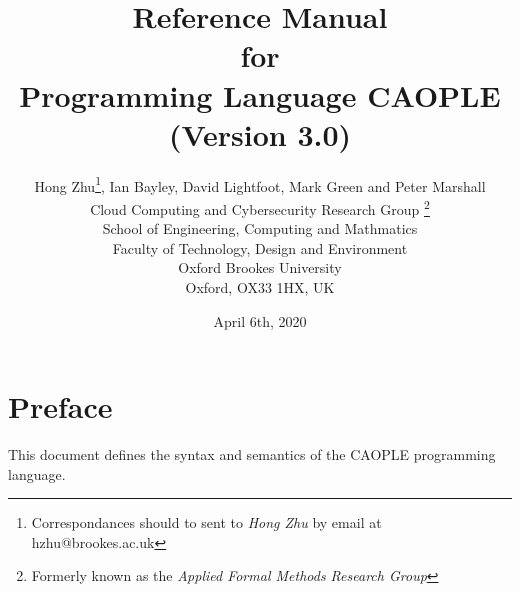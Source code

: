\documentclass[english]{report}
\begin{document}
\title{Reference Manual \\
for \\
Programming Language CAOPLE\\
{\normalsize (Version 3.0)}
}
\date{April 6th, 2020}


\author{Hong Zhu\footnote{Correspondances should to sent to \emph{Hong Zhu} by email at hzhu@brookes.ac.uk}, Ian Bayley, David Lightfoot, Mark Green and Peter Marshall\\
Cloud Computing and Cybersecurity Research Group \footnote{Formerly known as the \emph{Applied Formal Methods Research Group}}\\
School of Engineering, Computing and Mathmatics\\
Faculty of Technology, Design and Environment\\
Oxford Brookes University\\
Oxford, OX33 1HX, UK
}
  
\maketitle

\setcounter{page}{1}

\tableofcontents

%

%

\chapter*{Preface}

This document defines the syntax and semantics of the CAOPLE programming language. 
\end{document}

